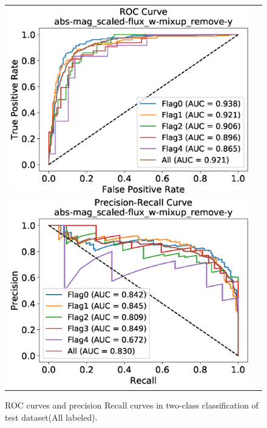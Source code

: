 \documentclass[useamsfonts]{pasj01}
\begin{document}
%
%
%
\begin{figure}[h]
    \begin{tabular}{cc}
        \begin{minipage}{0.5\hsize}
            \begin{center}
                \includegraphics[width=\columnwidth]{figures/10_abs-mag_scaled-flux_w-mixup_remove-y_predictions_test_ROC_all.eps}
            \end{center}
        \end{minipage}
        \begin{minipage}{0.5\hsize}
            \begin{center}
                \includegraphics[width=\columnwidth]{figures/10_abs-mag_scaled-flux_w-mixup_remove-y_predictions_test_PreRec_all.eps}
            \end{center}
        \end{minipage}
    \end{tabular}
    \caption{%
    ROC curves and precision Recall curves in two-class classification of test dataset(All labeled).
    }
    \label{fig:h2_test_all}
\end{figure}
\end{document}
